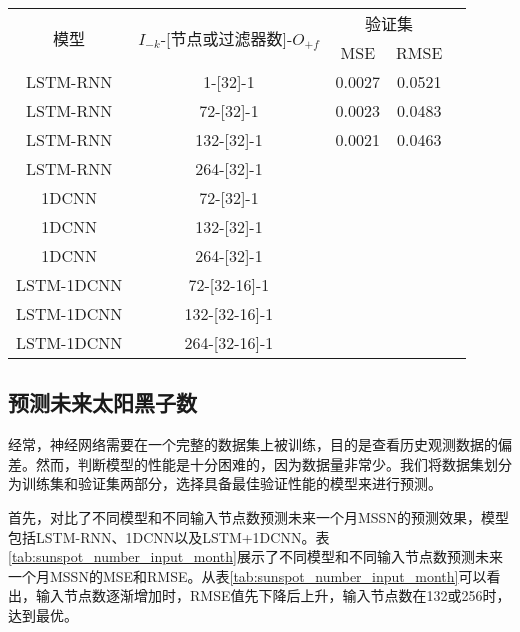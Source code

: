 \begin{table}[!htbp]
    \centering
    \label{tab:ss_area_out_1}
    \footnotesize
    \renewcommand{\arraystretch}{1}
    \begin{tabular}{ccccc}
    \toprule
    \multirow{2}{*}{模型} & \multirow{2}{*}{$I_{-k}$-[节点或过滤器数]-$O_{+f}$} & \multicolumn{2}{c}{验证集}\\
    \cmidrule(lr){3-4}
    \noalign{\smallskip}
    & & MSE & RMSE\\
    \midrule 
    LSTM-RNN & 1-[32]-1 & 0.0027 & 0.0521 \\
    LSTM-RNN & 72-[32]-1 & 0.0023 & 0.0483 \\
    LSTM-RNN & 132-[32]-1 & 0.0021 & 0.0463 \\
    LSTM-RNN & 264-[32]-1 & & \\
    \hline
    1DCNN & 72-[32]-1 & & \\
    1DCNN & 132-[32]-1 & & \\
    1DCNN & 264-[32]-1 & & \\
    \hline
    LSTM-1DCNN & 72-[32-16]-1 & & \\
    LSTM-1DCNN & 132-[32-16]-1 & & \\
    LSTM-1DCNN & 264-[32-16]-1 & & \\
    \bottomrule
    \end{tabular}
\end{table}

\subsection{预测未来太阳黑子数}\label{sec:ss_result_number}

经常，神经网络需要在一个完整的数据集上被训练，目的是查看历史观测数据的偏差。然而，判断模型的性能是十分困难的，因为数据量非常少。我们将数据集划分为训练集和验证集两部分，选择具备最佳验证性能的模型来进行预测。

首先，对比了不同模型和不同输入节点数预测未来一个月MSSN的预测效果，模型包括LSTM-RNN、1DCNN以及LSTM+1DCNN。表\ref{tab:sunspot_number_input_month}展示了不同模型和不同输入节点数预测未来一个月MSSN的MSE和RMSE。从表\ref{tab:sunspot_number_input_month}可以看出，输入节点数逐渐增加时，RMSE值先下降后上升，输入节点数在132或256时，达到最优。

